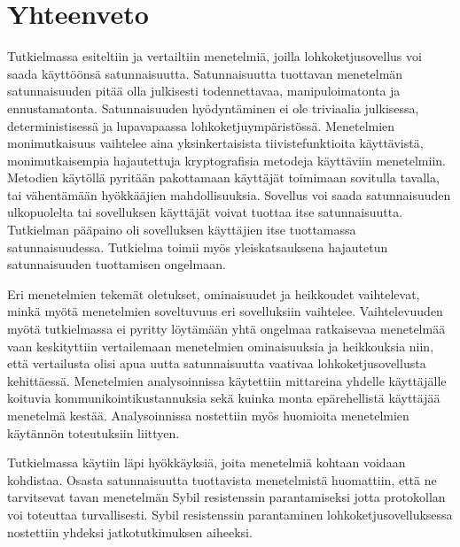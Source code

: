 \chapter{Yhteenveto\label{conclusions}}

Tutkielmassa esiteltiin ja vertailtiin menetelmiä, joilla lohkoketjusovellus voi saada käyttöönsä satunnaisuutta. Satunnaisuutta tuottavan menetelmän satunnaisuuden pitää olla julkisesti todennettavaa, manipuloimatonta ja ennustamatonta. Satunnaisuuden hyödyntäminen ei ole triviaalia julkisessa, deterministisessä ja lupavapaassa lohkoketjuympäristössä. Menetelmien monimutkaisuus vaihtelee aina yksinkertaisista tiivistefunktioita käyttävistä, monimutkaisempia hajautettuja kryptografisia metodeja käyttäviin menetelmiin. Metodien käytöllä pyritään pakottamaan käyttäjät toimimaan sovitulla tavalla, tai vähentämään hyökkääjien mahdollisuuksia. Sovellus voi saada satunnaisuuden ulkopuolelta tai sovelluksen käyttäjät voivat tuottaa itse satunnaisuutta. Tutkielman pääpaino oli sovelluksen käyttäjien itse tuottamassa satunnaisuudessa. Tutkielma toimii myös yleiskatsauksena hajautetun satunnaisuuden tuottamisen ongelmaan.

Eri menetelmien tekemät oletukset, ominaisuudet ja heikkoudet vaihtelevat, minkä myötä menetelmien soveltuvuus eri sovelluksiin vaihtelee. Vaihtelevuuden myötä tutkielmassa ei pyritty löytämään yhtä ongelmaa ratkaisevaa menetelmää vaan keskityttiin vertailemaan menetelmien ominaisuuksia ja heikkouksia niin, että vertailusta olisi apua uutta satunnaisuutta vaativaa lohkoketjusovellusta kehittäessä. Menetelmien analysoinnissa käytettiin mittareina yhdelle käyttäjälle koituvia kommunikointikustannuksia sekä kuinka monta epärehellistä käyttäjää menetelmä kestää. Analysoinnissa nostettiin myös huomioita menetelmien käytännön toteutuksiin liittyen.

Tutkielmassa käytiin läpi hyökkäyksiä, joita menetelmiä kohtaan voidaan kohdistaa. Osasta satunnaisuutta tuottavista menetelmistä huomattiin, että ne tarvitsevat tavan menetelmän Sybil resistenssin parantamiseksi jotta protokollan voi toteuttaa turvallisesti. Sybil resistenssin parantaminen lohkoketjusovelluksessa nostettiin yhdeksi jatkotutkimuksen aiheeksi.

